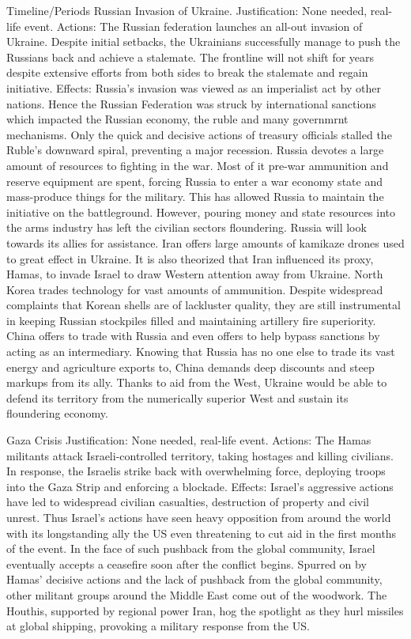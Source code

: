 Timeline/Periods
    Russian Invasion of Ukraine.
        Justification:
            None needed, real-life event.
        Actions:
            The Russian federation launches an all-out invasion of Ukraine.
            Despite initial setbacks, the Ukrainians successfully manage to push the Russians back and achieve a stalemate.
            The frontline will not shift for years despite extensive efforts from both sides to break the stalemate and regain initiative.
        Effects:
            Russia's invasion was viewed as an imperialist act by other nations. Hence the Russian Federation was struck by international sanctions which impacted the Russian economy, the ruble and many governmrnt mechanisms. Only the quick and decisive actions of treasury officials stalled the Ruble's downward spiral, preventing a major recession.
            Russia devotes a large amount of resources to fighting in the war. Most of it pre-war ammunition and reserve equipment are spent, forcing Russia to enter a war economy state and mass-produce things for the military. This has allowed Russia to maintain the initiative on the battleground. However, pouring money and state resources into the arms industry has left the civilian sectors floundering.
            Russia will look towards its allies for assistance. Iran offers large amounts of kamikaze drones used to great effect in Ukraine. It is also theorized that Iran influenced its proxy, Hamas, to invade Israel to draw Western attention away from Ukraine.
            North Korea trades technology for vast amounts of ammunition. Despite widespread complaints that Korean shells are of lackluster quality, they are still instrumental in keeping Russian stockpiles filled and maintaining artillery fire superiority.
            China offers to trade with Russia and even offers to help bypass sanctions by acting as an intermediary. Knowing that Russia has no one else to trade its vast energy and agriculture exports to, China demands deep discounts and steep markups from its ally.
            Thanks to aid from the West, Ukraine would be able to defend its territory from the numerically superior West and sustain its floundering economy.

    Gaza Crisis
        Justification:
            None needed, real-life event.
        Actions:
            The Hamas militants attack Israeli-controlled territory, taking hostages and killing civilians. In response, the Israelis strike back with overwhelming force, deploying troops into the Gaza Strip and enforcing a blockade.
        Effects:
            Israel's aggressive actions have led to widespread civilian casualties, destruction of property and civil unrest. Thus Israel's actions have seen heavy opposition from around the world with its longstanding ally the US even threatening to cut aid in the first months of the event. In the face of such pushback from the global community, Israel eventually accepts a ceasefire soon after the conflict begins.
            Spurred on by Hamas' decisive actions and the lack of pushback from the global community, other militant groups around the Middle East come out of the woodwork. The Houthis, supported by regional power Iran, hog the spotlight as they hurl missiles at global shipping, provoking a military response from the US.
    
